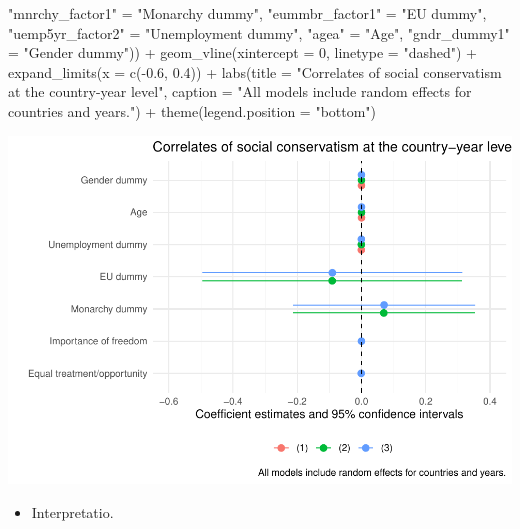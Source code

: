 \documentclass[
]{article}
\newenvironment{Shaded}{\begin{snugshade}}{\end{snugshade}}
\newcommand{\AttributeTok}[1]{\textcolor[rgb]{0.77,0.63,0.00}{#1}}
\newcommand{\DecValTok}[1]{\textcolor[rgb]{0.00,0.00,0.81}{#1}}
\newcommand{\FloatTok}[1]{\textcolor[rgb]{0.00,0.00,0.81}{#1}}
\newcommand{\FunctionTok}[1]{\textcolor[rgb]{0.00,0.00,0.00}{#1}}
\newcommand{\NormalTok}[1]{#1}
\newcommand{\OtherTok}[1]{\textcolor[rgb]{0.56,0.35,0.01}{#1}}
\newcommand{\SpecialCharTok}[1]{\textcolor[rgb]{0.00,0.00,0.00}{#1}}
\newcommand{\StringTok}[1]{\textcolor[rgb]{0.31,0.60,0.02}{#1}}
\providecommand{\tightlist}{%
  \setlength{\itemsep}{0pt}\setlength{\parskip}{0pt}}
\begin{document}
\begin{Shaded}
\begin{Highlighting}[]
                       \StringTok{"mnrchy\_factor1"} \OtherTok{=} \StringTok{"Monarchy dummy"}\NormalTok{, }
                       \StringTok{"eummbr\_factor1"} \OtherTok{=} \StringTok{"EU dummy"}\NormalTok{, }
                       \StringTok{"uemp5yr\_factor2"} \OtherTok{=} \StringTok{"Unemployment dummy"}\NormalTok{, }
                       \StringTok{"agea"} \OtherTok{=} \StringTok{"Age"}\NormalTok{, }
                       \StringTok{"gndr\_dummy1"} \OtherTok{=} \StringTok{"Gender dummy"}\NormalTok{)) }\SpecialCharTok{+}
  \FunctionTok{geom\_vline}\NormalTok{(}\AttributeTok{xintercept =} \DecValTok{0}\NormalTok{, }\AttributeTok{linetype =} \StringTok{"dashed"}\NormalTok{) }\SpecialCharTok{+}
  \FunctionTok{expand\_limits}\NormalTok{(}\AttributeTok{x =} \FunctionTok{c}\NormalTok{(}\SpecialCharTok{{-}}\FloatTok{0.6}\NormalTok{, }\FloatTok{0.4}\NormalTok{)) }\SpecialCharTok{+}
  \FunctionTok{labs}\NormalTok{(}\AttributeTok{title =} \StringTok{"Correlates of social conservatism at the country{-}year level"}\NormalTok{, }
       \AttributeTok{caption =} \StringTok{"All models include random effects for countries and years."}\NormalTok{) }\SpecialCharTok{+}
  \FunctionTok{theme}\NormalTok{(}\AttributeTok{legend.position =} \StringTok{"bottom"}\NormalTok{)}
\end{Highlighting}
\end{Shaded}

\includegraphics{AVCD-Assignment3-Edenhofer_files/figure-latex/socio-cons-cntry-year-re-1.pdf}

\begin{itemize}
\tightlist
\item
  Interpretatio.
\end{itemize}
\end{document}
